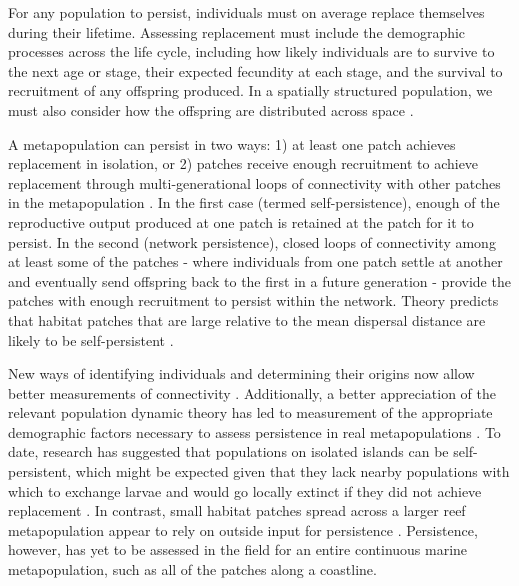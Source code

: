 \documentclass[12pt, oneside]{article}   	%
\begin{document}
For any population to persist, individuals must on average replace themselves during their lifetime. Assessing replacement must include the demographic processes across the life cycle, including how likely individuals are to survive to the next age or stage, their expected fecundity at each stage, and the survival to recruitment of any offspring produced. In a spatially structured population, we must also consider how the offspring are distributed across space \citep{hastings_persistence_2006}. %

A metapopulation can persist in two ways: 1) at least one patch achieves replacement in isolation, or 2) patches receive enough recruitment to achieve replacement through multi-generational loops of connectivity with other patches in the metapopulation \citep{hastings_persistence_2006, burgess2014beyond}. In the first case (termed self-persistence), enough of the reproductive output produced at one patch is retained at the patch for it to persist. In the second (network persistence), closed loops of connectivity among at least some of the patches - where individuals from one patch settle at another and eventually send offspring back to the first in a future generation - provide the patches with enough recruitment to persist within the network. Theory predicts that habitat patches that are large relative to the mean dispersal distance are likely to be self-persistent \citep{white_population_2010}. %

New ways of identifying individuals and determining their origins now allow better measurements of connectivity \citep{almany2017larval, daloia_self-recruitment_2013}. Additionally, a better appreciation of the relevant population dynamic theory has led to measurement of the appropriate demographic factors necessary to assess persistence in real metapopulations \citep{carson2011evaluating, hameed2016inverse}. To date, research has suggested that populations on isolated islands can be self-persistent, which might be expected given that they lack nearby populations with which to exchange larvae and would go locally extinct if they did not achieve replacement \cite{salles_coral_2015}. In contrast, small habitat patches spread across a larger reef metapopulation appear to rely on outside input for persistence \citep{johnson2018integrating}. Persistence, however, has yet to be assessed in the field for an entire continuous marine metapopulation, such as all of the patches along a coastline. 
\end{document}
